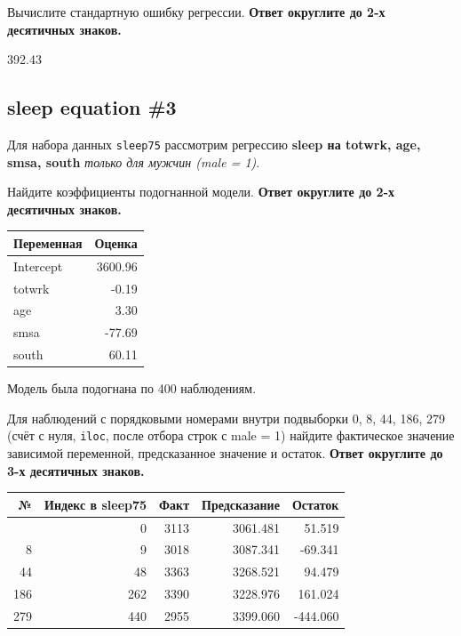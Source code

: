 \documentclass[
  russian,
]{article}
\newcounter{none} %
\begin{document}
Вычислите стандартную ошибку регрессии. \textbf{Ответ округлите до 2-х
десятичных знаков.}

\begin{tcolorbox}[enhanced jigsaw, arc=.35mm, bottomrule=.15mm, bottomtitle=1mm, breakable, colback=white, colbacktitle=quarto-callout-note-color!10!white, colframe=quarto-callout-note-color-frame, coltitle=black, left=2mm, leftrule=.75mm, opacityback=0, opacitybacktitle=0.6, rightrule=.15mm, title=\textcolor{quarto-callout-note-color}{\faInfo}\hspace{0.5em}{Стандартная ошибка регрессии}, titlerule=0mm, toprule=.15mm, toptitle=1mm]

392.43

\end{tcolorbox}

\subsection{sleep equation \#3}\label{sleep-equation-3}

Для набора данных \texttt{sleep75} рассмотрим регрессию \textbf{sleep на
totwrk, age, smsa, south} \emph{только для мужчин (male = 1)}.

Найдите коэффициенты подогнанной модели. \textbf{Ответ округлите до 2-х
десятичных знаков.}

{\def\LTcaptype{none} %
\begin{longtable}[]{@{}lr@{}}
\toprule\noalign{}
Переменная & Оценка \\
\midrule\noalign{}
\endhead
\bottomrule\noalign{}
\endlastfoot
Intercept & 3600.96 \\
totwrk & -0.19 \\
age & 3.30 \\
smsa & -77.69 \\
south & 60.11 \\
\end{longtable}
}

Модель была подогнана по 400 наблюдениям.

Для наблюдений с порядковыми номерами внутри подвыборки 0, 8, 44, 186,
279 (счёт с нуля, \texttt{iloc}, после отбора строк с male = 1) найдите
фактическое значение зависимой переменной, предсказанное значение и
остаток. \textbf{Ответ округлите до 3-х десятичных знаков.}

{\def\LTcaptype{none} %
\begin{longtable}[]{@{}rrrrr@{}}
\toprule\noalign{}
№ & Индекс в sleep75 & Факт & Предсказание & Остаток \\
\midrule\noalign{}
\endhead
\bottomrule\noalign{}
\endlastfoot
0 & 0 & 3113 & 3061.481 & 51.519 \\
8 & 9 & 3018 & 3087.341 & -69.341 \\
44 & 48 & 3363 & 3268.521 & 94.479 \\
186 & 262 & 3390 & 3228.976 & 161.024 \\
279 & 440 & 2955 & 3399.060 & -444.060 \\
\end{longtable}
}
\end{document}
